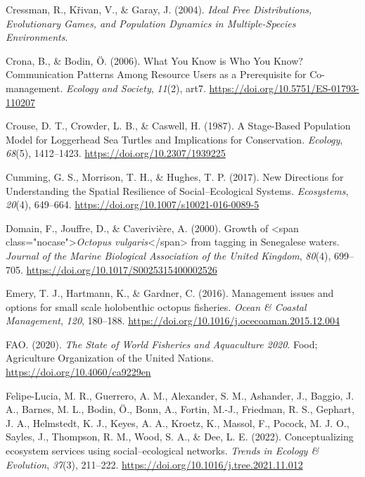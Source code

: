 \documentclass[
]{article}
\newlength{\cslhangindent}
\newlength{\cslentryspacingunit} %
\newenvironment{CSLReferences}[2] %
 {%
  \setlength{\parindent}{0pt}
  \ifodd #1
  \let\oldpar\par
  \def\par{\hangindent=\cslhangindent\oldpar}
  \fi
  \setlength{\parskip}{#2\cslentryspacingunit}
 }%
 {}
\begin{document}
\begin{CSLReferences}{1}{0}
\leavevmode{}%
Cressman, R., Křivan, V., \& Garay, J. (2004). \emph{Ideal {Free} {Distributions}, {Evolutionary} {Games}, and {Population} {Dynamics} in {Multiple}-{Species} {Environments}}.

\leavevmode{}%
Crona, B., \& Bodin, Ö. (2006). What {You} {Know} is {Who} {You} {Know}? {Communication} {Patterns} {Among} {Resource} {Users} as a {Prerequisite} for {Co}-management. \emph{Ecology and Society}, \emph{11}(2), art7. \url{https://doi.org/10.5751/ES-01793-110207}

\leavevmode{}%
Crouse, D. T., Crowder, L. B., \& Caswell, H. (1987). A {Stage}-{Based} {Population} {Model} for {Loggerhead} {Sea} {Turtles} and {Implications} for {Conservation}. \emph{Ecology}, \emph{68}(5), 1412--1423. \url{https://doi.org/10.2307/1939225}

\leavevmode{}%
Cumming, G. S., Morrison, T. H., \& Hughes, T. P. (2017). New {Directions} for {Understanding} the {Spatial} {Resilience} of {Social}--{Ecological} {Systems}. \emph{Ecosystems}, \emph{20}(4), 649--664. \url{https://doi.org/10.1007/s10021-016-0089-5}

\leavevmode{}%
Domain, F., Jouffre, D., \& Caverivière, A. (2000). Growth of {\textless{}}span class="nocase"{\textgreater{}}\emph{{Octopus} vulgaris}{\textless{}}/span{\textgreater{}} from tagging in {Senegalese} waters. \emph{Journal of the Marine Biological Association of the United Kingdom}, \emph{80}(4), 699--705. \url{https://doi.org/10.1017/S0025315400002526}

\leavevmode{}%
Emery, T. J., Hartmann, K., \& Gardner, C. (2016). Management issues and options for small scale holobenthic octopus fisheries. \emph{Ocean \& Coastal Management}, \emph{120}, 180--188. \url{https://doi.org/10.1016/j.ocecoaman.2015.12.004}

\leavevmode{}%
FAO. (2020). \emph{The {State} of {World} {Fisheries} and {Aquaculture} 2020}. Food; Agriculture Organization of the United Nations. \url{https://doi.org/10.4060/ca9229en}

\leavevmode{}%
Felipe-Lucia, M. R., Guerrero, A. M., Alexander, S. M., Ashander, J., Baggio, J. A., Barnes, M. L., Bodin, Ö., Bonn, A., Fortin, M.-J., Friedman, R. S., Gephart, J. A., Helmstedt, K. J., Keyes, A. A., Kroetz, K., Massol, F., Pocock, M. J. O., Sayles, J., Thompson, R. M., Wood, S. A., \& Dee, L. E. (2022). Conceptualizing ecosystem services using social--ecological networks. \emph{Trends in Ecology \& Evolution}, \emph{37}(3), 211--222. \url{https://doi.org/10.1016/j.tree.2021.11.012}


\end{CSLReferences}
\end{document}
